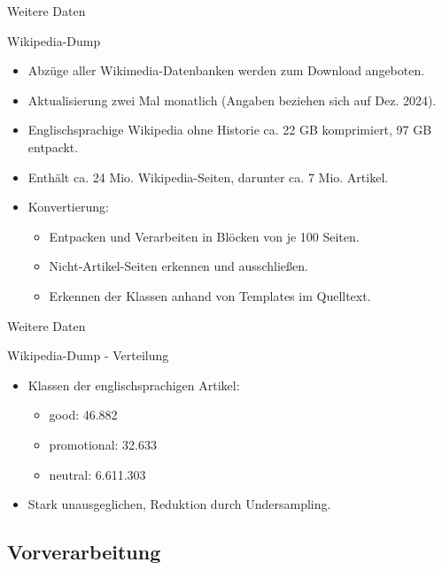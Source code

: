 \documentclass[aspectratio=169]{beamer} %
\begin{document}
\begin{frame}{Weitere Daten}
    \begin{block}{Wikipedia-Dump}
        \begin{itemize}
            \item Abzüge aller Wikimedia-Datenbanken werden zum Download angeboten.
            \item Aktualisierung zwei Mal monatlich (Angaben beziehen sich auf Dez. 2024).
            \item Englischsprachige Wikipedia ohne Historie ca. 22 GB komprimiert, 97 GB entpackt.
            \item Enthält ca. 24 Mio. Wikipedia-Seiten, darunter ca. 7 Mio. Artikel.
            \item Konvertierung:
            \begin{itemize}
                \item Entpacken und Verarbeiten in Blöcken von je 100 Seiten.
                \item Nicht-Artikel-Seiten erkennen und ausschließen.
                \item Erkennen der Klassen anhand von Templates im Quelltext.
            \end{itemize}
        \end{itemize}
    \end{block}
\end{frame}

\begin{frame}{Weitere Daten}
    \begin{block}{Wikipedia-Dump - Verteilung}
        \begin{itemize}
            \item Klassen der englischsprachigen Artikel:
                  \begin{itemize}
                      \item good: 46.882
                      \item promotional: 32.633
                      \item neutral: 6.611.303
                  \end{itemize}
            \item Stark unausgeglichen, Reduktion durch Undersampling.
        \end{itemize}
    \end{block}
\end{frame}

\subsection{Vorverarbeitung}
\end{document}
